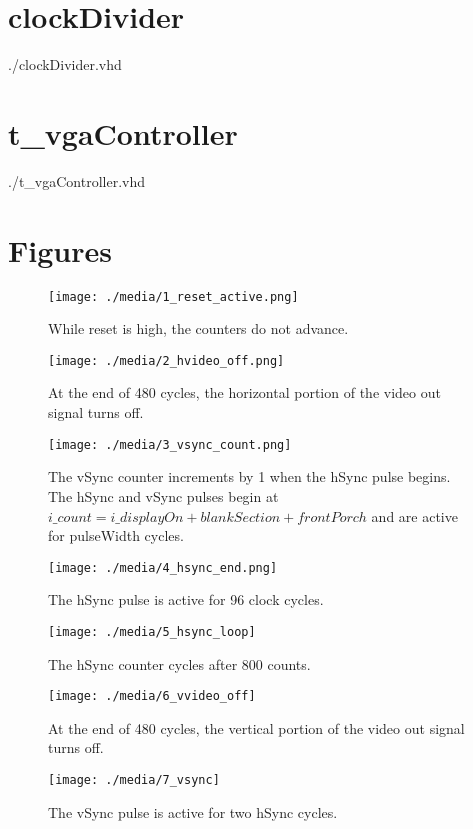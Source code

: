 \documentclass[twoside, letterpaper]{report}
\begin{document}
\chapter{clockDivider}
 {./clockDivider.vhd}

\chapter{t\_vgaController}
 {./t_vgaController.vhd}

\chapter{Figures}
\begin{figure}
\centering
\texttt{[image: ./media/1\_reset\_active.png]}
\caption{While reset is high, the counters do not advance.}
\end{figure}

\begin{figure}
\centering
\texttt{[image: ./media/2\_hvideo\_off.png]}
\caption{At the end of 480 cycles, the horizontal portion of the video out signal turns off.}
\end{figure}

\begin{figure}
\centering
\texttt{[image: ./media/3\_vsync\_count.png]}
\caption{The vSync counter increments by 1 when the hSync pulse begins. The hSync and vSync pulses begin at $i\_count = i\_displayOn + blankSection + frontPorch$ and are active for pulseWidth cycles.}
\end{figure}

\begin{figure}
\centering
\texttt{[image: ./media/4\_hsync\_end.png]}
\caption{The hSync pulse is active for 96 clock cycles.}
\end{figure}

\begin{figure}
\centering
\texttt{[image: ./media/5\_hsync\_loop]}
\caption{The hSync counter cycles after 800 counts.}
\end{figure}

\begin{figure}
\centering
\texttt{[image: ./media/6\_vvideo\_off]}
\caption{At the end of 480 cycles, the vertical portion of the video out signal turns off.}
\end{figure}

\begin{figure}
\centering
\texttt{[image: ./media/7\_vsync]}
\caption{The vSync pulse is active for two hSync cycles.}
\end{figure}
\end{document}
